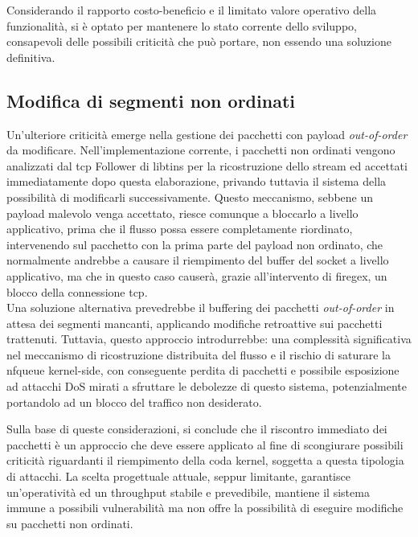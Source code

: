 Considerando il rapporto costo-beneficio e il limitato valore operativo della funzionalità, si è optato per mantenere lo stato corrente dello sviluppo, consapevoli delle possibili criticità che può portare, non essendo una soluzione definitiva.

\subsection{Modifica di segmenti non ordinati}

Un'ulteriore criticità emerge nella gestione dei pacchetti con payload \emph{out-of-order} da modificare. Nell'implementazione corrente, i pacchetti non ordinati vengono analizzati dal \gls{tcp} Follower di libtins per la ricostruzione dello stream ed accettati immediatamente dopo questa elaborazione, privando tuttavia il sistema della possibilità di modificarli successivamente. Questo meccanismo, sebbene un payload malevolo venga accettato, riesce comunque a bloccarlo a livello applicativo, prima che il flusso possa essere completamente riordinato, intervenendo sul pacchetto con la prima parte del payload non ordinato, che normalmente andrebbe a causare il riempimento del buffer del socket a livello applicativo, ma che in questo caso causerà, grazie all'intervento di firegex, un blocco della connessione \gls{tcp}.\\

Una soluzione alternativa prevedrebbe il buffering dei pacchetti \emph{out-of-order} in attesa dei segmenti mancanti, applicando modifiche retroattive sui pacchetti trattenuti. Tuttavia, questo approccio introdurrebbe: una complessità significativa nel meccanismo di ricostruzione distribuita del flusso e il rischio di saturare la \gls{nfqueue} kernel-side, con conseguente perdita di pacchetti e possibile esposizione ad attacchi DoS mirati a sfruttare le debolezze di questo sistema, potenzialmente portandolo ad un blocco del traffico non desiderato.

Sulla base di queste considerazioni, si conclude che il riscontro immediato dei pacchetti è un approccio che deve essere applicato al fine di scongiurare possibili criticità riguardanti il riempimento della coda kernel, soggetta a questa tipologia di attacchi. La scelta progettuale attuale, seppur limitante, garantisce un'operatività ed un throughput stabile e prevedibile, mantiene il sistema immune a possibili vulnerabilità ma non offre la possibilità di eseguire modifiche su pacchetti non ordinati.\\

